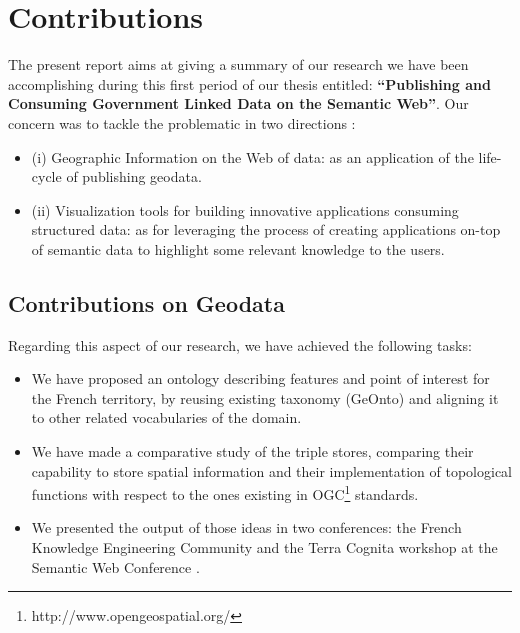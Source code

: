 \documentclass[a4paper,11pt]{report}
\begin{document}

\section{Contributions}
The present report aims at giving a summary of our research we have been accomplishing
during this first period of our thesis entitled: \textbf{``Publishing and Consuming Government Linked Data on the Semantic Web''}. Our concern was to tackle the problematic in two directions : 
\begin{itemize}
\item (i) Geographic Information on the Web of data: as an application of the life-cycle of publishing geodata.
\item (ii) Visualization tools for building innovative applications consuming structured data: as for leveraging the process of creating applications on-top of semantic data to highlight some relevant knowledge to the users.

\end{itemize}

\subsection{Contributions on Geodata}
Regarding this aspect of our research, we have achieved the following tasks:
 \begin{itemize}
  \item We have proposed an ontology describing features and point of interest for the French territory, by reusing existing taxonomy (GeOnto) and aligning it to other related vocabularies of the domain.
 \item We have made a comparative study of the triple stores, comparing their capability to store spatial information and their implementation of topological functions with respect to the ones 
existing in OGC\footnote{http://www.opengeospatial.org/} standards.
 \item We presented the output of those ideas in two conferences: the French Knowledge Engineering Community \cite{atemezing2012a} and the Terra Cognita workshop at the Semantic Web Conference \cite{atemezing2012b}.

\end{itemize}
\end{document}

